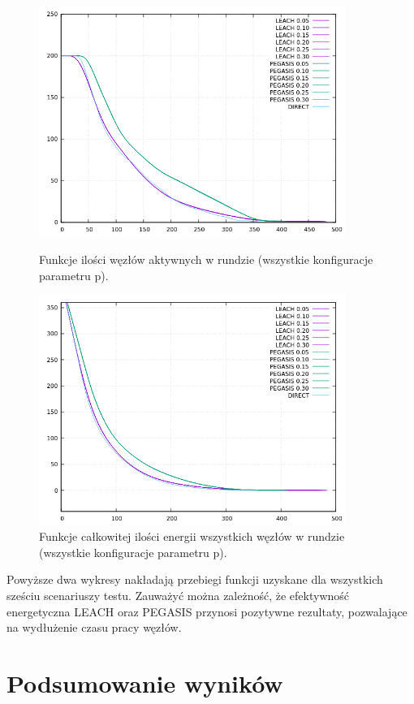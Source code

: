 \documentclass[a4paper,12pt,twoside,openany]{report}
\begin{document}
\begin{figure}[H]
 \centering
 \includegraphics[width=10cm]{images/gnuplot/test_4/nodes_in_round_all.png}
 \caption{Funkcje ilości węzłów aktywnych w rundzie (wszystkie konfiguracje parametru p).}
 \includegraphics[width=10cm]{images/gnuplot/test_4/energy_in_round_all.png}
 \caption{Funkcje całkowitej ilości energii wszystkich węzłów w rundzie (wszystkie konfiguracje parametru p).}
\end{figure}

\par
Powyższe dwa wykresy nakładają przebiegi funkcji uzyskane dla wszystkich sześciu scenariuszy testu.
Zauważyć można zależność, że efektywność energetyczna LEACH oraz PEGASIS przynosi pozytywne rezultaty, pozwalające na wydłużenie czasu pracy węzłów.

\section{Podsumowanie wyników}

\end{document}
